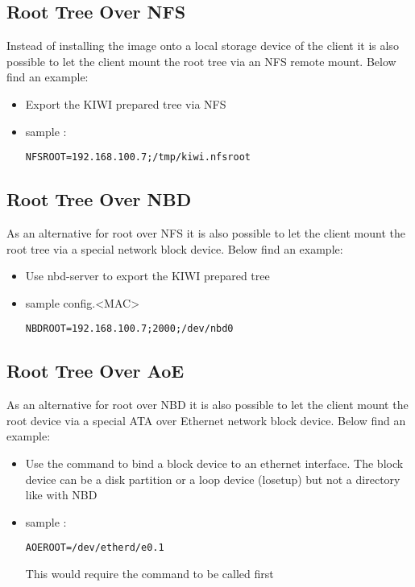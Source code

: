 \subsection{Root Tree Over NFS}
Instead of installing the image onto a local storage device of
the client it is also possible to let the client mount the root
tree via an NFS remote mount. Below find an example:

\begin{itemize}
\item Export the KIWI prepared tree via NFS
\item sample :

\begin{verbatim}
NFSROOT=192.168.100.7;/tmp/kiwi.nfsroot
\end{verbatim}
\end{itemize}

\subsection{Root Tree Over NBD}

As an alternative for root over NFS it is also possible to
let the client mount the root tree via a special network block
device. Below find an example:

\begin{itemize}
\item Use nbd-server to export the KIWI prepared tree
\item sample config.<MAC>

\begin{verbatim}
NBDROOT=192.168.100.7;2000;/dev/nbd0
\end{verbatim}
\end{itemize}

\subsection{Root Tree Over AoE}

As an alternative for root over NBD it is also possible to
let the client mount the root device via a special ATA over
Ethernet network block device. Below find an example:

\begin{itemize}
\item Use the  command to bind a block device to an
      ethernet interface. The block device can be a disk
      partition or a loop device (losetup) but not a directory 
      like with NBD
\item sample :

\begin{verbatim}
AOEROOT=/dev/etherd/e0.1
\end{verbatim}

      This would require the command
       
      to be called first
\end{itemize}

